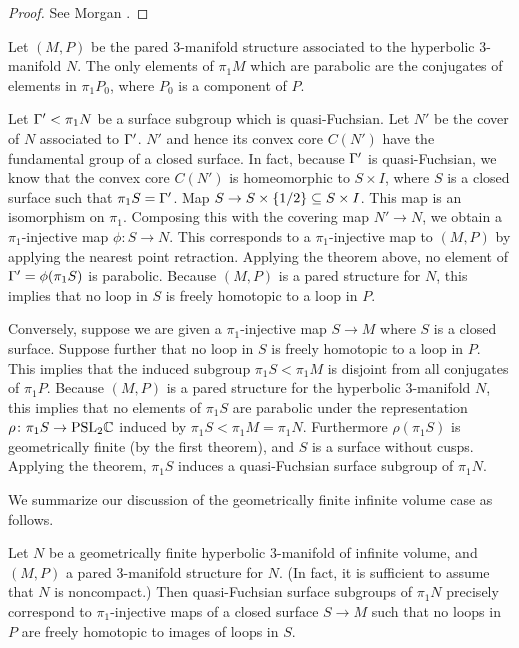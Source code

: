 \begin{proof}

See Morgan \cite[Proposition 7.1]{Mo}. %

\end{proof}


Let $(M,P)$ be the pared $3$-manifold structure associated to the hyperbolic
$3$-manifold $N$. The only elements of $\pi_1M$ which are parabolic are the
conjugates of elements in $\pi_1P_0$, where $P_0$ is a component of $P$.

Let $\Gamma' < \pi_1N$ be a surface subgroup which is quasi-Fuchsian. Let $N'$ be
the cover of $N$ associated to $\Gamma'$. $N'$ and hence its convex core $C(N')$
have the fundamental group of a closed surface. In fact, because $\Gamma'$ is
quasi-Fuchsian, we know that the convex core $C(N')$ is homeomorphic to $S
\times I$, where $S$ is a closed surface such that $\pi_1S = \Gamma'$.  Map $S \to
S \times \{1/2\} \subseteq S \times I$. This map is an isomorphism on $\pi_1$.
Composing this with the covering map $N' \to N$, we obtain a $\pi_1$-injective
map $\phi \colon S \to N$.  This corresponds to a $\pi_1$-injective map to
$(M,P)$ by applying the nearest point retraction.  Applying the theorem above,
no element of $\Gamma'=\phi(\pi_1S)$ is parabolic.  Because $(M,P)$ is a pared
structure for $N$, this implies that no loop in $S$ is freely homotopic to
a loop in $P$.

Conversely, suppose we are given a $\pi_1$-injective map $S \to M$ where $S$ is
a closed surface.  Suppose further that no loop in $S$ is freely homotopic to
a loop in $P$.  This implies that the induced subgroup $\pi_1S < \pi_1M$ is
disjoint from all conjugates of $\pi_1P$.  Because $(M,P)$ is a pared structure
for the hyperbolic $3$-manifold $N$, this implies that no elements of $\pi_1S$
are parabolic under the representation $\rho \colon \pi_1S \to \mathrm{PSL}_2\mathbb{C}$
induced by $\pi_1S < \pi_1M=\pi_1N$.  Furthermore $\rho(\pi_1S)$ is
geometrically finite (by the first theorem), and $S$ is a surface without
cusps.  Applying the theorem, $\pi_1S$ induces a quasi-Fuchsian surface
subgroup of $\pi_1N$.

We summarize our discussion of the geometrically finite infinite volume case as
follows.

\begin{prop}

Let $N$ be a geometrically finite hyperbolic $3$-manifold of infinite volume,
and $(M,P)$ a pared $3$-manifold structure for $N$. (In fact, it is sufficient
to assume that $N$ is noncompact.) Then quasi-Fuchsian surface subgroups of
$\pi_1N$ precisely correspond to $\pi_1$-injective maps of a closed surface $S
\to M$ such that no loops in $P$ are freely homotopic to images of loops in
$S$.

\end{prop}


